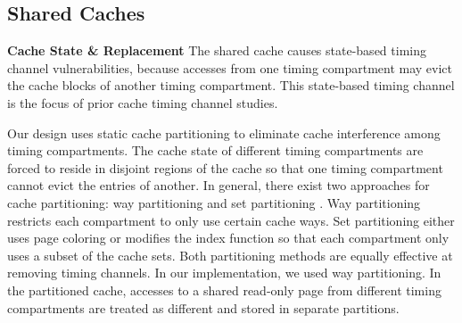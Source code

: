 \subsection{Shared Caches}
\textbf{Cache State \& Replacement}
The shared cache causes state-based timing channel vulnerabilities, because 
accesses from one timing compartment may evict the cache blocks of another
timing compartment. This state-based timing channel is the focus of prior
cache timing channel studies.

Our design uses static cache partitioning to eliminate cache
interference among timing compartments.
The cache state of different timing compartments are forced to reside in 
disjoint regions of the cache so that one timing compartment cannot evict the 
entries of another.
In general, there exist two approaches for cache partitioning:
way partitioning \cite{dynamic_partitioning} and
set partitioning \cite{rtas_cache_framework}. Way partitioning restricts
each compartment to only use certain cache ways. Set partitioning
either uses page coloring or modifies the index function so that each 
compartment
only uses a subset of the cache sets. Both partitioning methods are equally
effective at removing timing channels. In our implementation, we used way 
partitioning.
In the partitioned cache, accesses to a shared read-only page from different
timing compartments are treated as different and stored in separate partitions.





